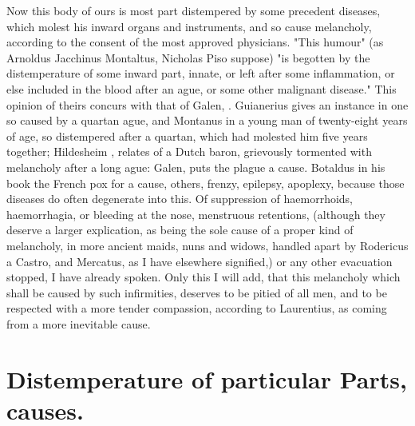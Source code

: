 Now this body of ours is most part distempered by some precedent diseases,
which molest his inward organs and instruments, and so 
cause melancholy, according to the consent of the most approved physicians.
"This humour" (as \Avicenna{}  Arnoldus 
Jacchinus  Montaltus,
 Nicholas Piso 
\etc{} suppose) "is begotten by the distemperature of some inward part, innate,
or left after some inflammation, or else included in the blood after an
ague, or some other malignant disease." This opinion of
theirs concurs with that of Galen, . Guianerius gives an instance in one so caused by a quartan ague, and
Montanus  in a young man of twenty-eight
years of age, so distempered after a quartan, which had molested him five years
together; Hildesheim , relates of a
Dutch baron, grievously tormented with melancholy after a long
ague: Galen, 
puts the plague a cause. Botaldus in his book  the French pox for a cause, others, frenzy, epilepsy, apoplexy,
because those diseases do often degenerate into this. Of suppression of
haemorrhoids, haemorrhagia, or bleeding at the nose, menstruous retentions,
(although they deserve a larger explication, as being the sole cause of a
proper kind of melancholy, in more ancient maids, nuns and widows, handled
apart by Rodericus a Castro, and Mercatus, as I have elsewhere signified,) or
any other evacuation stopped, I have already spoken. Only this I will add, that
this melancholy which shall be caused by such infirmities, deserves to be
pitied of all men, and to be respected with a more tender compassion, according
to Laurentius, as coming from a more inevitable cause.
\section{Distemperature of particular Parts, causes.}

